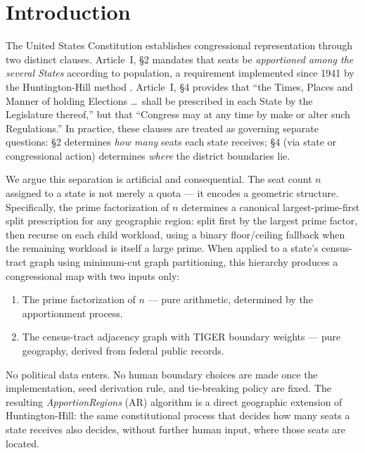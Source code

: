 \section{Introduction}
\label{sec:intro}

The United States Constitution establishes congressional representation through
two distinct clauses. Article~I, \S2 mandates that seats be
\emph{apportioned among the several States} according to population, a
requirement implemented since 1941 by the Huntington-Hill method
\citep{balinski2001fair}. Article~I, \S4 provides that ``the Times, Places and
Manner of holding Elections \ldots\ shall be prescribed in each State by the
Legislature thereof,'' but that ``Congress may at any time by make or alter
such Regulations.'' In practice, these clauses are treated as governing
separate questions: \S2 determines \emph{how many} seats each state receives;
\S4 (via state or congressional action) determines \emph{where} the district
boundaries lie.

We argue this separation is artificial and consequential. The seat count $n$
assigned to a state is not merely a quota --- it encodes a geometric structure.
Specifically, the prime factorization of $n$ determines a canonical
largest-prime-first split prescription for any geographic region: split first
by the largest prime factor, then recurse on each child workload, using a
binary floor/ceiling fallback when the remaining workload is itself a large
prime. When applied to a state's census-tract graph using minimum-cut graph
partitioning, this hierarchy produces a congressional map with two inputs only:
\begin{enumerate}
  \item The prime factorization of $n$ --- pure arithmetic, determined by the
        apportionment process.
  \item The census-tract adjacency graph with TIGER boundary weights --- pure
        geography, derived from federal public records.
\end{enumerate}
No political data enters. No human boundary choices are made once the
implementation, seed derivation rule, and tie-breaking policy are fixed. The resulting
\emph{ApportionRegions} (AR) algorithm is a direct geographic
extension of Huntington-Hill: the same constitutional process that decides how
many seats a state receives also decides, without further human input, where
those seats are located.

